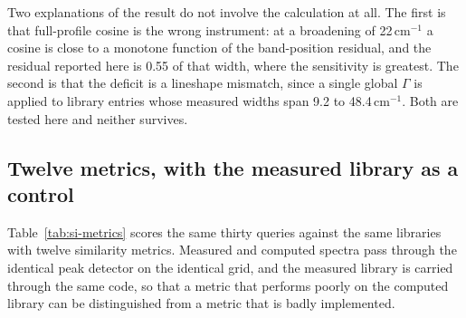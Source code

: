 \documentclass[11pt]{article}
\newcommand*\wn{\ensuremath{\text{cm}^{-1}}}
\begin{document}
Two explanations of the result do not involve the calculation at all. The first is that
full-profile cosine is the wrong instrument: at a broadening of 22\,\wn{} a cosine is close
to a monotone function of the band-position residual, and the residual reported here is 0.55
of that width, where the sensitivity is greatest. The second is that the deficit is a
lineshape mismatch, since a single global $\Gamma$ is applied to library entries whose
measured widths span 9.2 to 48.4\,\wn{}. Both are tested here and neither survives.

\subsection{Twelve metrics, with the measured library as a control}

Table~\ref{tab:si-metrics} scores the same thirty queries against the same libraries with
twelve similarity metrics. Measured and computed spectra pass through the identical peak
detector on the identical grid, and the measured library is carried through the same code,
so that a metric that performs poorly on the computed library can be distinguished from a
metric that is badly implemented.
\end{document}
